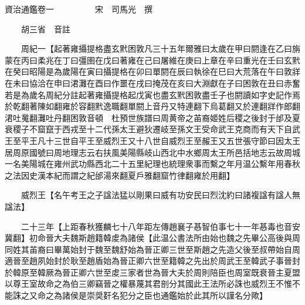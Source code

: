 ﻿資治通鑑卷一　　　　　宋　司馬光　撰

　　胡三省　音註

　　周紀一【起著雍攝提格盡玄黓困敦凡三十五年爾雅曰太歲在甲曰閼逢在乙曰旃蒙在丙曰柔兆在丁曰彊圉在戊曰著雍在己曰屠維在庚曰上章在辛曰重光在壬曰玄黓在癸曰昭陽是為歲陽在寅曰攝提格在卯曰單閼在辰曰執徐在巳曰大荒落在午曰敦牂在未曰協洽在申曰涒灘在酉曰作噩在戌曰掩茂在亥曰大淵獻在子曰困敦在丑曰赤奮若是為歲名周紀分註起著雍攝提格起戊寅也盡玄黓困敦盡壬子也閼讀如字史記作焉於乾翻著陳如翻雍於容翻黓逸職翻單閼上音丹又特連翻下烏葛翻又於連翻牂作郎翻涒吐䰟翻灘吐丹翻困敦音頓　杜預世族譜曰周黄帝之苖裔姬姓后稷之後封于邰及夏衰稷子不窟竄于西戎至十二代孫太王避狄遷岐至孫文王受命武王克商而有天下自武王至平王凡十三世自平王至威烈王又十八世自威烈王至赧王又五世張守節曰因太王居周原國號曰周地理志云右扶風美陽縣岐山西北中水鄉周太王所邑括地志云故周城一名美陽城在雍州武功縣西北二十五里紀理也統理衆事而繫之年月温公繫年用春秋之法因史漢本紀而謂之紀邰湯來翻夏戶雅翻窟竹律翻雍於用翻】

　　威烈王【名午考王之子諡法猛以剛果曰威有功安民曰烈沈約曰諸複諡有諡人無諡法】

　　二十三年【上距春秋獲麟七十八年距左傳趙襄子惎智伯事七十一年惎毒也音安冀翻】初命晉大夫魏斯趙籍韓䖍為諸侯【此温公書法所由始也魏之先畢公高後與周同姓其苖裔曰畢萬始封于魏至魏舒始為晉正卿三世至斯趙之先造父後至叔帶始自周適晉至趙夙始封於耿至趙盾始為晉正卿六世至籍韓之先出於周武王至韓武子事晉封於韓原至韓厥為晉正卿六世至䖍三家者世為晉大夫於周則陪臣也周室既衰晉主夏盟以尊王室故命之為伯三卿竊晉之權暴蔑其君剖分其國此王法所必誅也威烈王不惟不能誅之又命之為諸侯是崇奨姧名犯分之臣也通鑑始於此其所以謹名分歟】

